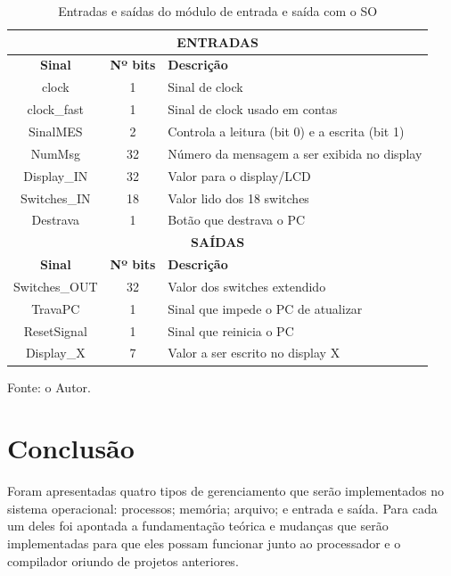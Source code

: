\documentclass[
	12pt,				%
	oneside,
	a4paper,			%
	english,			%
	french,				%
	spanish,			%
	brazil,				%
	]{abntex2}
\begin{document}
\setlength{\tabcolsep}{10pt} %
\begin{table}[H]
\centering
\caption{Entradas e saídas do módulo de entrada e saída com o SO}
\label{tab:IO_Entrada_E_Saida_2.0}
\begin{tabular}{|c|c|l|}
\hline	
\multicolumn{3}{|c|}{\textbf{ENTRADAS}} \\
\hline
\textbf{Sinal} & \textbf{Nº bits} & \textbf{Descrição} \\
\hline
clock & 1 & Sinal de clock \\
\hline
clock\_fast & 1 & Sinal de clock usado em contas \\
\hline
SinalMES & 2 & Controla a leitura (bit 0) e a escrita (bit 1)\\
\hline
NumMsg & 32 & Número da mensagem a ser exibida no display \\
\hline
Display\_IN & 32 & Valor para o display/LCD \\
\hline
Switches\_IN & 18 & Valor lido dos 18 switches\\
\hline
Destrava & 1 & Botão que destrava o PC \\
\hline
\multicolumn{3}{|c|}{\textbf{SAÍDAS}} \\
\hline
\textbf{Sinal} & \textbf{Nº bits} & \textbf{Descrição} \\
\hline
Switches\_OUT & 32 & Valor dos switches extendido \\
\hline
TravaPC & 1 & Sinal que impede o PC de atualizar \\
\hline
ResetSignal & 1 & Sinal que reinicia o PC \\
\hline
Display\_X & 7 & Valor a ser escrito no display X \\
\hline
\end{tabular}
\vspace{-0.5em}
\begin{center}
Fonte: o Autor.
\end{center}
\end{table} 

\chapter{Conclusão}
Foram apresentadas quatro tipos de gerenciamento que serão implementados no sistema operacional: processos; memória; arquivo; e entrada e saída. Para cada um deles foi apontada a fundamentação teórica e mudanças que serão implementadas para que eles possam funcionar junto ao processador e o compilador oriundo de projetos anteriores.
\end{document}
